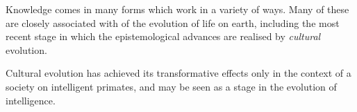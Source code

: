 Knowledge comes in many forms which work in a variety of ways.
Many of these are closely associated with of the evolution of life on earth, including the most recent stage in which the epistemological advances are realised by \emph{cultural} evolution.

Cultural evolution has achieved its transformative effects only in the context of a society on intelligent primates, and may be seen as a stage in the evolution of intelligence.

